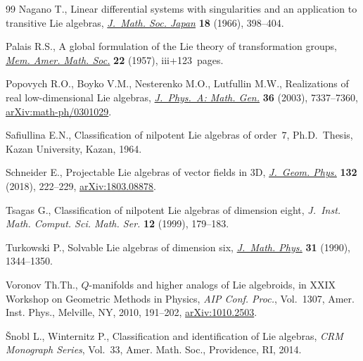 \documentclass[pdftex]{sigma}
\numberwithin{equation}{section}
\begin{document}
\begin{thebibliography}{99}
Nagano T., Linear differential systems with singularities and an application to
 transitive {L}ie algebras, \href{https://doi.org/10.2969/jmsj/01840398}{\textit{J.~Math. Soc. Japan}} \textbf{18} (1966), 398--404.

Palais R.S., A global formulation of the {L}ie theory of transformation groups,
 \href{https://doi.org/10.1090/memo/0022}{\textit{Mem. Amer. Math. Soc.}} \textbf{22} (1957), iii+123~pages.

Popovych R.O., Boyko V.M., Nesterenko M.O., Lutfullin M.W., Realizations of
 real low-dimensional {L}ie algebras, \href{https://doi.org/10.1088/0305-4470/36/26/309}{\textit{J.~Phys.~A: Math. Gen.}}
 \textbf{36} (2003), 7337--7360, \href{https://arxiv.org/abs/math-ph/0301029}{arXiv:math-ph/0301029}.

Safiullina E.N., Classification of nilpotent {L}ie algebras of order~{$7$},
 Ph.D.~Thesis, {K}azan University, Kazan, 1964.

Schneider E., Projectable {L}ie algebras of vector fields in 3{D},
 \href{https://doi.org/10.1016/j.geomphys.2018.05.025}{\textit{J.~Geom. Phys.}} \textbf{132} (2018), 222--229, \href{https://arxiv.org/abs/1803.08878}{arXiv:1803.08878}.

Tsagas G., Classification of nilpotent {L}ie algebras of dimension eight,
 \textit{J.~Inst. Math. Comput. Sci. Math. Ser.} \textbf{12} (1999), 179--183.

Turkowski P., Solvable {L}ie algebras of dimension six, \href{https://doi.org/10.1063/1.528721}{\textit{J.~Math. Phys.}}
 \textbf{31} (1990), 1344--1350.

Voronov Th.Th., {$Q$}-manifolds and higher analogs of {L}ie algebroids, in X{XIX}
 {W}orkshop on {G}eometric {M}e\-thods in {P}hysics, \textit{AIP Conf. Proc.},
 Vol.~1307, Amer. Inst. Phys., Melville, NY, 2010, 191--202,
 \href{https://arxiv.org/abs/1010.2503}{arXiv:1010.2503}.

\v{S}nobl L., Winternitz P., Classification and identification of {L}ie
 algebras, \textit{CRM Monograph Series}, Vol.~33, Amer. Math. Soc.,
 Providence, RI, 2014.

\end{thebibliography}\LastPageEnding
\end{document}
